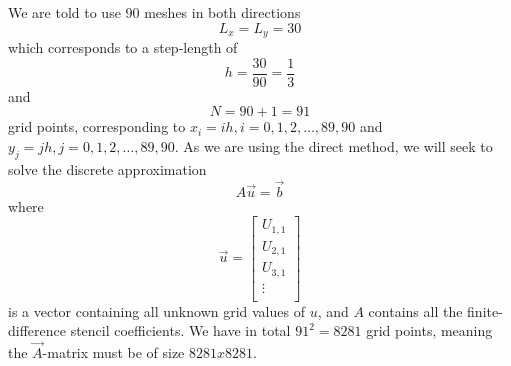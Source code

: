   \begin{derivation}
    We are told to use 90 meshes in both directions
    \begin{equation}
      L_x = L_y = 30
    \end{equation}
    which corresponds to a step-length of 
    \begin{equation}
      h = \frac{30}{90} = \frac{1}{3}
    \end{equation}  
    and
    \begin{equation}
      N = 90 + 1 = 91
    \end{equation}
    grid points, corresponding to $x_i = ih, i = 0,1,2,\ldots ,89,90$ and $y_j = jh, j = 0,1,2,\ldots ,89,90$.
    As we are using the direct method, we will seek to solve the discrete approximation
    \begin{equation}
      A \Vec{u} = \Vec{b}
    \end{equation}
    where
    \begin{equation}
      \Vec{u} = \begin{bmatrix}
        U_{1,1}\\
      U_{2,1}\\
      U_{3,1}\\
      \vdots\\
      \end{bmatrix}
    \end{equation}
    is a vector containing all unknown grid values of $u$, and $A$ contains all the finite-difference stencil coefficients.
    We have in total $91^2 = \num{8281} $ grid points, meaning the $\Vec{A}$-matrix must be of size $\num{8281} x \num{8281}$.


\end{derivation}
